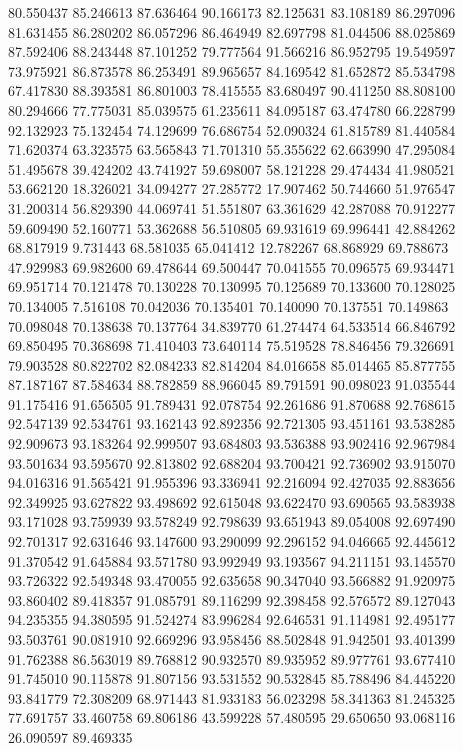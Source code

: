 80.550437
85.246613
87.636464
90.166173
82.125631
83.108189
86.297096
81.631455
86.280202
86.057296
86.464949
82.697798
81.044506
88.025869
87.592406
88.243448
87.101252
79.777564
91.566216
86.952795
19.549597
73.975921
86.873578
86.253491
89.965657
84.169542
81.652872
85.534798
67.417830
88.393581
86.801003
78.415555
83.680497
90.411250
88.808100
80.294666
77.775031
85.039575
61.235611
84.095187
63.474780
66.228799
92.132923
75.132454
74.129699
76.686754
52.090324
61.815789
81.440584
71.620374
63.323575
63.565843
71.701310
55.355622
62.663990
47.295084
51.495678
39.424202
43.741927
59.698007
58.121228
29.474434
41.980521
53.662120
18.326021
34.094277
27.285772
17.907462
50.744660
51.976547
31.200314
56.829390
44.069741
51.551807
63.361629
42.287088
70.912277
59.609490
52.160771
53.362688
56.510805
69.931619
69.996441
42.884262
68.817919
9.731443
68.581035
65.041412
12.782267
68.868929
69.788673
47.929983
69.982600
69.478644
69.500447
70.041555
70.096575
69.934471
69.951714
70.121478
70.130228
70.130995
70.125689
70.133600
70.128025
70.134005
7.516108
70.042036
70.135401
70.140090
70.137551
70.149863
70.098048
70.138638
70.137764
34.839770
61.274474
64.533514
66.846792
69.850495
70.368698
71.410403
73.640114
75.519528
78.846456
79.326691
79.903528
80.822702
82.084233
82.814204
84.016658
85.014465
85.877755
87.187167
87.584634
88.782859
88.966045
89.791591
90.098023
91.035544
91.175416
91.656505
91.789431
92.078754
92.261686
91.870688
92.768615
92.547139
92.534761
93.162143
92.892356
92.721305
93.451161
93.538285
92.909673
93.183264
92.999507
93.684803
93.536388
93.902416
92.967984
93.501634
93.595670
92.813802
92.688204
93.700421
92.736902
93.915070
94.016316
91.565421
91.955396
93.336941
92.216094
92.427035
92.883656
92.349925
93.627822
93.498692
92.615048
93.622470
93.690565
93.583938
93.171028
93.759939
93.578249
92.798639
93.651943
89.054008
92.697490
92.701317
92.631646
93.147600
93.290099
92.296152
94.046665
92.445612
91.370542
91.645884
93.571780
93.992949
93.193567
94.211151
93.145570
93.726322
92.549348
93.470055
92.635658
90.347040
93.566882
91.920975
93.860402
89.418357
91.085791
89.116299
92.398458
92.576572
89.127043
94.235355
94.380595
91.524274
83.996284
92.646531
91.114981
92.495177
93.503761
90.081910
92.669296
93.958456
88.502848
91.942501
93.401399
91.762388
86.563019
89.768812
90.932570
89.935952
89.977761
93.677410
91.745010
90.115878
91.807156
93.531552
90.532845
85.788496
84.445220
93.841779
72.308209
68.971443
81.933183
56.023298
58.341363
81.245325
77.691757
33.460758
69.806186
43.599228
57.480595
29.650650
93.068116
26.090597
89.469335
